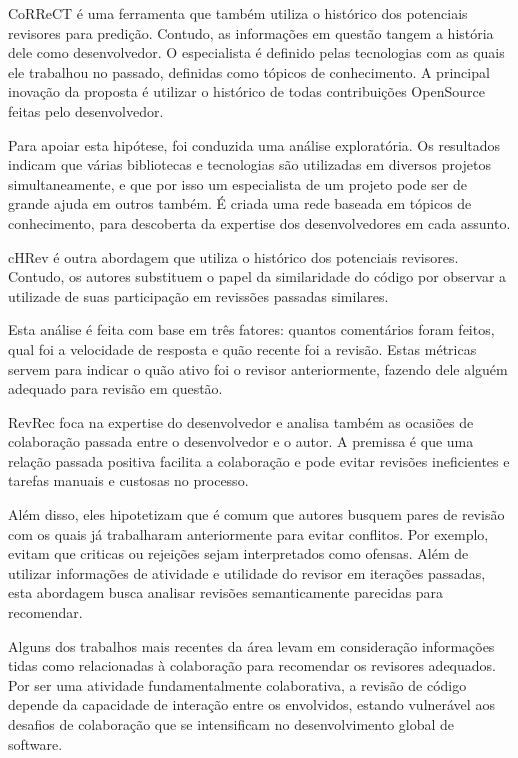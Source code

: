 \documentclass[sigconf]{acmart}
\begin{document}
CoRReCT \cite{rahman2016} é uma ferramenta que também utiliza o histórico dos potenciais revisores para predição. Contudo, as informações em questão tangem a história dele como desenvolvedor. O especialista é definido pelas tecnologias com as quais ele trabalhou no passado, definidas como tópicos de conhecimento. A principal inovação da proposta é utilizar o histórico de todas contribuições OpenSource feitas pelo desenvolvedor.

Para apoiar esta hipótese, foi conduzida uma análise exploratória. Os resultados indicam que várias bibliotecas e tecnologias são utilizadas em diversos projetos simultaneamente, e que por isso um especialista de um projeto pode ser de grande ajuda em outros também. É criada uma rede baseada em tópicos de conhecimento, para descoberta da expertise dos desenvolvedores em cada assunto.


cHRev \cite{zanjani2016} é outra abordagem que utiliza o histórico dos potenciais revisores. Contudo, os autores substituem o papel da similaridade do código por observar a utilizade de suas participação em revissões passadas similares.

Esta análise é feita com base em três fatores: quantos comentários foram feitos, qual foi a velocidade de resposta e quão recente foi a revisão. Estas métricas servem para indicar o quão ativo foi o revisor anteriormente, fazendo dele alguém adequado para revisão em questão.

RevRec \cite{ouni2016} foca na expertise do desenvolvedor e analisa também as ocasiões de colaboração passada entre o desenvolvedor e o autor. A premissa é que uma relação passada positiva facilita a colaboração e pode evitar revisões ineficientes e tarefas manuais e custosas no processo.

Além disso, eles hipotetizam que é comum que autores busquem pares de revisão com os quais já trabalharam anteriormente para evitar conflitos. Por exemplo, evitam que criticas ou rejeições sejam interpretados como ofensas. Além de utilizar informações de atividade e utilidade do revisor em iterações passadas, esta abordagem busca analisar revisões semanticamente parecidas para recomendar.


Alguns dos trabalhos mais recentes da área levam em consideração informações tidas como relacionadas à colaboração para recomendar os revisores adequados\cite{ouni2016, zanjani2016}. Por ser uma atividade fundamentalmente colaborativa, a revisão de código depende da capacidade de interação entre os envolvidos, estando vulnerável aos desafios de colaboração que se intensificam no desenvolvimento global de software.
\end{document}

